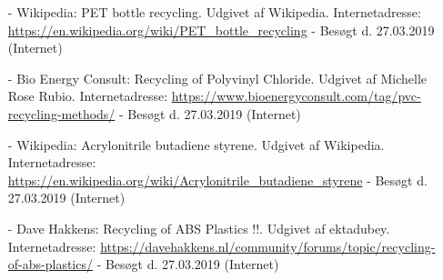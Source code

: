 \documentclass[12pt]{article}
\begin{document}
\begin{enumerate}
        \item[-] Wikipedia: PET bottle recycling. Udgivet af Wikipedia. Internetadresse: \url{https://en.wikipedia.org/wiki/PET_bottle_recycling} - Besøgt d. 27.03.2019 (Internet)
        \item[-] Bio Energy Consult: Recycling of Polyvinyl Chloride. Udgivet af Michelle Rose Rubio. Internetadresse: \url{https://www.bioenergyconsult.com/tag/pvc-recycling-methods/} - Besøgt d. 27.03.2019 (Internet)
        \item[-] Wikipedia: Acrylonitrile butadiene styrene. Udgivet af Wikipedia. Internetadresse: \url{https://en.wikipedia.org/wiki/Acrylonitrile_butadiene_styrene} - Besøgt d. 27.03.2019 (Internet)
        \item[-] Dave Hakkens: Recycling of ABS Plastics !!. Udgivet af ektadubey. Internetadresse: \url{https://davehakkens.nl/community/forums/topic/recycling-of-abs-plastics/} - Besøgt d. 27.03.2019 (Internet)

\end{enumerate}
\end{document}
